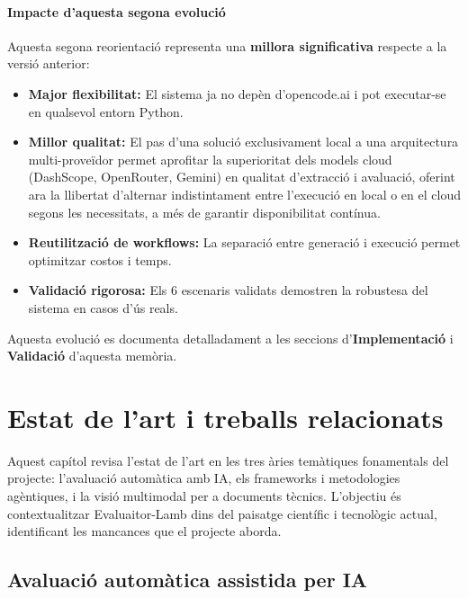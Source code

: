 \documentclass[12pt,a4paper,twoside]{report}
\begin{document}
\subsubsection{Impacte d'aquesta segona evoluci\'o}

Aquesta segona reorientaci\'o representa una \textbf{millora significativa} respecte a la versi\'o anterior:

\begin{itemize}
    \item \textbf{Major flexibilitat:} El sistema ja no dep\`en d'opencode.ai i pot executar-se en qualsevol entorn Python.
    \item \textbf{Millor qualitat:} El pas d'una soluci\'o exclusivament local a una arquitectura multi-prove\"idor permet aprofitar la superioritat dels models cloud (DashScope, OpenRouter, Gemini) en qualitat d'extracci\'o i avaluaci\'o, oferint ara la llibertat d'alternar indistintament entre l'execuci\'o en local o en el cloud segons les necessitats, a m\'es de garantir disponibilitat cont\'inua.
    \item \textbf{Reutilitzaci\'o de workflows:} La separaci\'o entre generaci\'o i execuci\'o permet optimitzar costos i temps.
    \item \textbf{Validaci\'o rigorosa:} Els 6 escenaris validats demostren la robustesa del sistema en casos d'\'us reals.
\end{itemize}

Aquesta evoluci\'o es documenta detalladament a les seccions d'\textbf{Implementaci\'o} i \textbf{Validaci\'o} d'aquesta mem\`oria.
\chapter{Estat de l'art i treballs relacionats}
\label{chap:estat-art}

Aquest cap\'itol revisa l'estat de l'art en les tres \`aries tem\`atiques fonamentals del projecte: l'avaluaci\'o autom\`atica amb IA, els frameworks i metodologies ag\`entiques, i la visi\'o multimodal per a documents t\`ecnics. L'objectiu \'es contextualitzar Evaluaitor-Lamb dins del paisatge cient\'ific i tecnol\`ogic actual, identificant les mancances que el projecte aborda.

\section{Avaluaci\'o autom\`atica assistida per IA}
\label{sec:aval-auto-ia}
\end{document}

